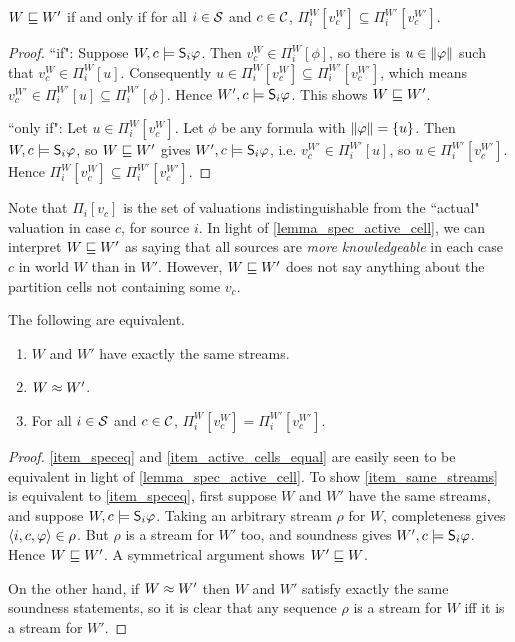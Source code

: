 \begin{lemma}
    \label{lemma_spec_active_cell}
    $W \specleq W'$ if and only if for all $i \in \srcs$ and $c \in \css$,
    $\Pi^W_i[v^W_c] \subseteq \Pi^{W'}_i[v^{W'}_c]$.
\end{lemma}

\begin{proof}
    ``if": Suppose $W, c \models \S_i\phi$. Then $v^W_c \in \Pi^W_i[\phi]$, so
    there is $u \in \propmods{\phi}$ such that $v^W_c \in \Pi^W_i[u]$.
    Consequently $u \in \Pi^W_i[v^W_c] \subseteq \Pi^{W'}_i[v^{W'}_c]$, which
    means $v^{W'}_c \in \Pi^{W'}_i[u] \subseteq \Pi^{W'}_i[\phi]$. Hence $W', c
    \models \S_i\phi$. This shows $W \specleq W'$.

    ``only if": Let $u \in \Pi^W_i[v^W_c]$. Let $\phi$ be any formula with
    $\propmods{\phi} = \{u\}$. Then $W, c \models \S_i\phi$, so $W \specleq W'$
    gives $W', c \models \S_i\phi$, i.e. $v^{W'}_c \in \Pi^{W'}_i[u]$, so $u
    \in \Pi^{W'}_i[v^{W'}_c]$. Hence $\Pi^W_i[v^W_c] \subseteq
    \Pi^{W'}_i[v^{W'}_c]$.
\end{proof}

Note that $\Pi_i[v_c]$ is the set of valuations indistinguishable from the
``actual" valuation in case $c$, for source $i$. In light of
\cref{lemma_spec_active_cell}, we can interpret $W \specleq W'$ as saying that
all sources are \emph{more knowledgeable} in each case $c$ in world $W$ than in
$W'$. However, $W \specleq W'$ does not say anything about the partition cells
not containing some $v_c$.

\begin{proposition}
    \label{prop_speceq_equivalent_conditions}
    The following are equivalent.
    \begin{enumerate}
        \item\label{item_same_streams} $W$ and $W'$ have exactly the same
            streams.
        \item\label{item_speceq} $W \speceq W'$.
        \item\label{item_active_cells_equal} For all $i \in \srcs$ and $c \in
            \css$, $\Pi^W_i[v^W_c] = \Pi^{W'}_i[v^{W'}_c]$.
    \end{enumerate}
\end{proposition}

\begin{proof}
    \cref{item_speceq} and \cref{item_active_cells_equal} are easily seen to be
    equivalent in light of \cref{lemma_spec_active_cell}. To show
    \cref{item_same_streams} is equivalent to \cref{item_speceq}, first suppose
    $W$ and $W'$ have the same streams, and suppose $W, c \models \S_i\phi$.
    Taking an arbitrary stream $\rho$ for $W$, completeness gives $\tuple{i, c,
    \phi} \in \rho$. But $\rho$ is a stream for $W'$ too, and soundness gives
    $W', c \models \S_i\phi$. Hence $W \specleq W'$. A symmetrical argument
    shows $W' \specleq W$.

    On the other hand, if $W \speceq W'$ then $W$ and $W'$ satisfy exactly the
    same soundness statements, so it is clear that any sequence $\rho$ is a
    stream for $W$ iff it is a stream for $W'$.
\end{proof}

